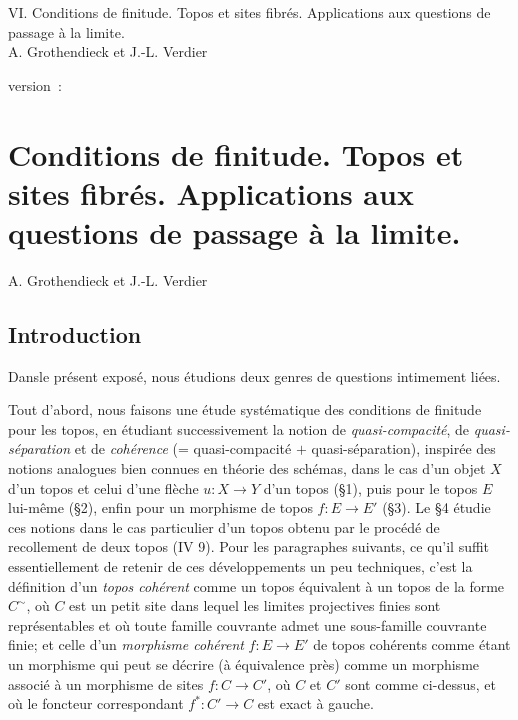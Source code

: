 \documentclass[10pt]{../fichiers-configuration-latex/smfart}
\begin{document}
\begin{center}
VI. Conditions de finitude. Topos et sites fibrés. Applications
aux questions de passage à la limite.\\
A. Grothendieck et J.-L. Verdier
\end{center}

version : \showgitstatus{}
\tableofcontents

\else
\chapter{Conditions de finitude. Topos et sites fibrés. Applications
aux questions de passage à la limite.}
\begin{center}
A. Grothendieck et J.-L. Verdier
\end{center}
\fi

\setcounter{pageoriginal}{164}

\setcounter{section}{-1}
\section{Introduction}

Dans\pageoriginale le présent exposé, nous étudions deux
genres de questions
intimement liées.

Tout d'abord, nous faisons une étude systématique des conditions de
finitude pour les topos, en étudiant successivement la notion de
\emph{quasi-compacité}, de \emph{quasi-séparation} et de
\emph{cohérence} (= quasi-compacité $+$ quasi-séparation),
inspirée
des notions analogues bien connues en théorie des schémas, dans le
cas d'un objet $X$ d'un topos et celui d'une flèche $u : X \to Y$
d'un topos (\S 1), puis pour le topos $E$ lui-même (\S 2), enfin
pour un morphisme de topos $f : E \to E'$ (\S 3). Le \S 4 étudie ces
notions dans le cas particulier d'un topos obtenu par le procédé de
recollement de deux topos (IV 9). Pour les paragraphes suivants, ce
qu'il suffit essentiellement de retenir de ces développements un peu
techniques, c'est la définition d'un \emph{topos cohérent} comme un
topos équivalent à un topos de la forme $C^{\sim}$, où $C$ est
un petit site dans lequel les limites projectives finies sont
représentables et où toute famille couvrante admet une
sous-famille couvrante finie; et celle d'un \emph{morphisme
cohérent} $f : E \to E'$ de topos cohérents comme étant un morphisme
qui peut se décrire (à équivalence près) comme un morphisme associé
à un morphisme de sites $f : C \to C'$, où $C$ et $C'$ sont
comme ci-dessus, et où le foncteur correspondant $f^{\ast} :
C'\to C$ est exact à gauche.
\end{document}
